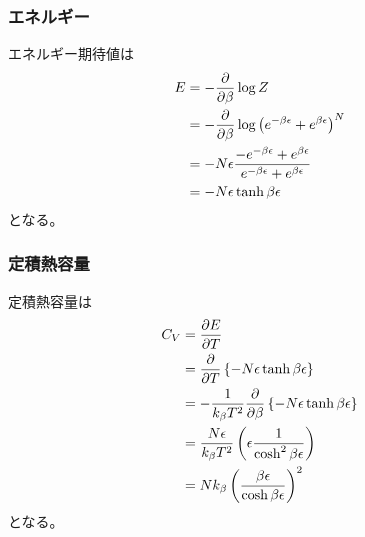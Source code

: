 \documentclass[dvipdfmx, 11pt, a4paper]{jsarticle}
\theoremstyle{definition}
\begin{document}
\subsubsection{エネルギー}
    エネルギー期待値は
    \begin{align}
        E &= -\frac{\partial }{\partial \beta} \log Z \notag \\
        &= -\frac{\partial }{\partial \beta} \log \left( e^{-\beta \epsilon} + e^{\beta \epsilon} \right)^N \notag \\
        &= -N \epsilon \frac{-e^{-\beta \epsilon} + e^{\beta \epsilon} }{e^{-\beta \epsilon} + e^{\beta \epsilon} } \notag \\
        &= -N \epsilon \tanh \beta \epsilon
    \end{align}
    となる。
\subsubsection{定積熱容量}
    定積熱容量は
    \begin{align}
        C_V &= \frac{\partial E}{\partial T} \\
        &= \frac{\partial}{\partial T} \left\{ -N \epsilon \tanh \beta \epsilon \right\} \notag \\
        &= - \frac{1}{k_\beta T^2} \frac{\partial }{\partial \beta} \left\{ -N \epsilon \tanh \beta \epsilon \right\} \notag \\
        &= \frac{N \epsilon}{k_\beta T^2} \left( \epsilon \frac{1}{\cosh^2 \beta \epsilon} \right) \notag \\
        &= Nk_\beta \left( \frac{\beta \epsilon}{\cosh \beta \epsilon} \right)^2
    \end{align}
    となる。
\end{document}
